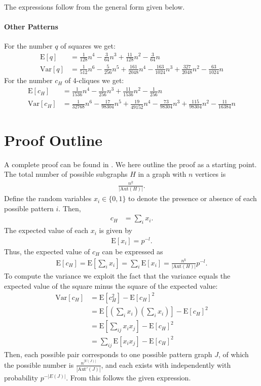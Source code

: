 \documentclass{article}
\begin{document}
The expressions follow from the general form given below. 

\paragraph{Other Patterns}
For the number $q$ of squares we get:
\begin{align*}
  \mathrm{E}[q] &= \frac{1}{128}n^4 -\frac{3}{64}n^3
  +\frac{11}{128}n^2 -\frac{3}{64}n   \\
  \mathrm{Var}[q] &= \frac 1 {512} n^6 - \frac 5 {256} n^5 + \frac
         {161}{2048} n^4 - \frac{163}{1024}n^3 + \frac{327}{2048} n^2 -
         \frac{63}{1024}n 
\end{align*}
For the number $c_H$ of 4-cliques we get: 
\begin{align*}
  \mathrm{E}[c_H] &= \frac{1}{1536}n^4 -\frac{1}{256}n^3
  +\frac{11}{1536}n^2 -\frac{1}{256}n \\
  \mathrm{Var}[c_H] &= \frac{1}{32768}n^6 -\frac{17}{98304}n^5
  +\frac{19}{49152}n^4 -\frac{73}{98304}n^3 +\frac{115}{98304}n^2
  -\frac{11}{16384}n 
\end{align*}

\section{Proof Outline}
A complete proof can be found in \cite{gp6}.  We here outline the proof
as a starting point. The total number of possible subgraphs $H$ in a graph
with $n$ vertices is 
\begin{align*}
  \frac{n^{\underline{k}}}{|\mathrm{Aut}(H)|}.
\end{align*}
Define the random variables $x_i\in \{0,1\}$ to denote the
presence or absence of each possible pattern $i$.  
Then, 
\begin{align*}
  c_H &= \sum_i x_i.
\end{align*}
The expected value of each $x_i$ is given by
\begin{align*}
  \mathrm{E}[x_i] = p^{-l}.
\end{align*}
Thus, the expected value of $c_H$ can be expressed as
\begin{align*}
  \mathrm{E}[c_H] = \mathrm{E}[\sum_i x_i] = \sum_i \mathrm{E}[x_i]
  = \frac{n^{\underline{k}}}{|\mathrm{Aut}(H)|} p^{-l}.
\end{align*}
To compute the variance we exploit the fact that the variance equals the
expected value of the square minus the square of the expected value: 
\begin{align*}
  \mathrm{Var}[c_H] &= \mathrm{E}[c_H^2] - \mathrm{E}[c_H]^2 \\
  &= \mathrm{E}[(\sum_i x_i)(\sum_i x_i)] - \mathrm{E}[c_H]^2 \\
  &= \mathrm{E}[\sum_{ij} x_i x_j] - \mathrm{E}[c_H]^2 \\
  &= \sum_{ij} \mathrm{E}[x_i x_j] - \mathrm{E}[c_H]^2
\end{align*}
Then, each possible pair corresponds to one possible pattern graph $J$,
of which the possible number is
$\frac{n^{\underline{|V(J)|}}}{|\mathrm{Aut'}(J)|}$, and each exists
with independently with probability $p^{-|E(J)|}$.  From this follows
the given expression. 
\end{document}
